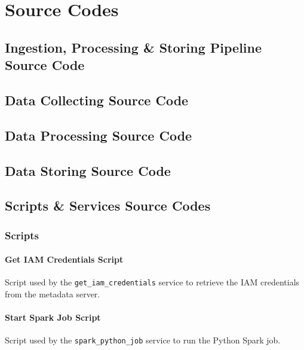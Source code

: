 \documentclass[12pt,oneside]{book} %
\begin{document}
\chapter{Source Codes}
\begin{subappendices}
    \section{Ingestion, Processing \& Storing Pipeline Source Code}\label{appendix:main}
    

    \newpage
    \section{Data Collecting Source Code}\label{appendix:collecting}
    

    \newpage
    \section{Data Processing Source Code}\label{appendix:processing}
    

    \newpage
    \section{Data Storing Source Code}\label{appendix:storing}
    

    \newpage
    \section{Scripts \& Services Source Codes }
    \subsection{Scripts}

    \subsubsection{Get IAM Credentials Script}
    Script used by the \texttt{get\_iam\_credentials} service to retrieve the IAM
    credentials from the metadata server.\label{appendix:get-iam-credentials}
    

    \subsubsection{Start Spark Job Script}
    Script used by the \texttt{spark\_python\_job} service to run the Python Spark
    job.\label{appendix:start-spark-job}
    


\end{subappendices}
\end{document}
